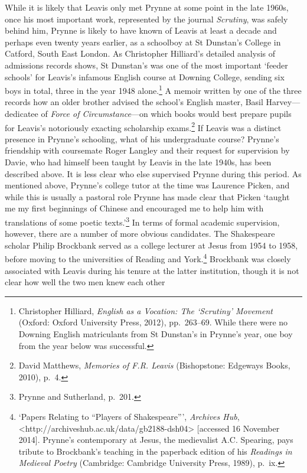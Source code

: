 \documentclass[]{article}
\begin{document}
While it is likely that Leavis only met Prynne at some point in the late
1960s, once his most important work, represented by the journal
\emph{Scrutiny}, was safely behind him, Prynne is likely to have known
of Leavis at least a decade and perhaps even twenty years earlier, as a
schoolboy at St Dunstan’s College in Catford, South East London. As
Christopher Hilliard’s detailed analysis of admissions records shows, St
Dunstan’s was one of the most important ‘feeder schools’ for Leavis’s
infamous English course at Downing College, sending six boys in total,
three in the year 1948 alone.\footnote{Christopher Hilliard,
  \emph{English as a Vocation: The ‘Scrutiny’ Movement} (Oxford: Oxford
  University Press, 2012), pp.~263–69. While there were no Downing
  English matriculants from St Dunstan’s in Prynne’s year, one boy from
  the year below was successful.} A memoir written by one of the three
records how an older brother advised the school’s English master, Basil
Harvey—dedicatee of \emph{Force of Circumstance}—on which books would
best prepare pupils for Leavis’s notoriously exacting scholarship
exams.\footnote{David Matthews, \emph{Memories of F.R. Leavis}
  (Bishopstone: Edgeways Books, 2010), p.~4.} If Leavis was a distinct
presence in Prynne’s schooling, what of his undergraduate course?
Prynne’s friendship with coursemate Roger Langley and their request for
supervision by Davie, who had himself been taught by Leavis in the late
1940s, has been described above. It is less clear who else supervised
Prynne during this period. As mentioned above, Prynne’s college tutor at
the time was Laurence Picken, and while this is usually a pastoral role
Prynne has made clear that Picken ‘taught me my first beginnings of
Chinese and encouraged me to help him with translations of some poetic
texts.’\footnote{Prynne and Sutherland, p.~201.} In terms of formal
academic supervision, however, there are a number of more obvious
candidates. The Shakespeare scholar Philip Brockbank served as a college
lecturer at Jesus from 1954 to 1958, before moving to the universities
of Reading and York.\footnote{‘Papers Relating to “Players of
  Shakespeare”’, \emph{Archives Hub},
  \textless{}http://archiveshub.ac.uk/data/gb2188-dsh04\textgreater{}
  {[}accessed 16 November 2014{]}. Prynne’s contemporary at Jesus, the
  medievalist A.C. Spearing, pays tribute to Brockbank’s teaching in the
  paperback edition of his \emph{Readings in Medieval Poetry}
  (Cambridge: Cambridge University Press, 1989), p.~ix.} Brockbank was
closely associated with Leavis during his tenure at the latter
institution, though it is not clear how well the two men knew each other
\end{document}
